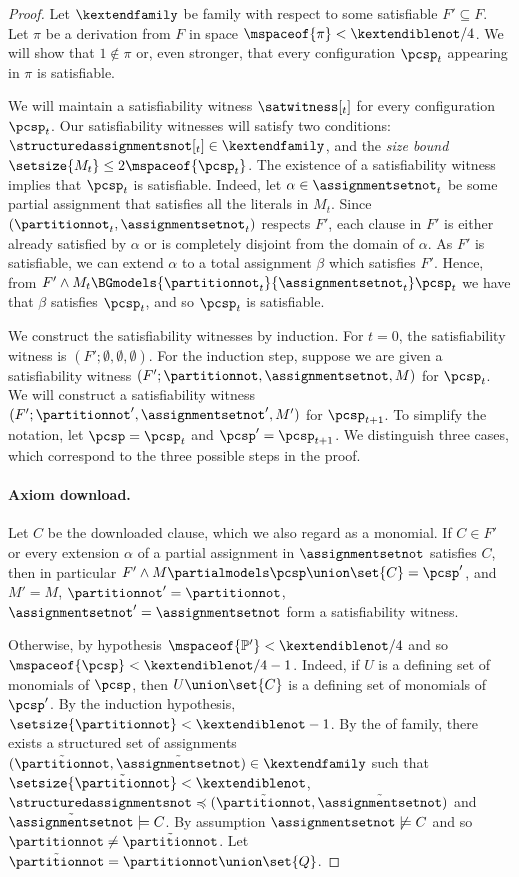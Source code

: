 \documentclass{toc}
\begin{document}
\begin{proof}
  Let $\kextendfamily$ be \akextendible family with respect to some satisfiable $F'\subseteq F$. Let $\pi$ be a derivation from $F$ in space $\mspaceof{\pi}< \kextendiblenot/4$. We will show that $1 \notin\pi$ or, even stronger, that every configuration $\pcsp_t$ appearing in $\pi$ is satisfiable.

  We will maintain a satisfiability witness $\satwitness[_t]$ for every configuration $\pcsp_t$. Our satisfiability witnesses will satisfy two conditions: $\structuredassignmentsnot[_t] \in \kextendfamily$, and the \emph{size bound} $\setsize{M_t} \leq 2\mspaceof{\pcsp_t}$. The existence of a satisfiability witness implies that $\pcsp_t$ is satisfiable. Indeed, let $\alpha \in \assignmentsetnot_t$ be some partial assignment that satisfies all the literals in $M_t$. Since $(\partitionnot_t,\assignmentsetnot_t)$ respects $F'$, each clause in $F'$ is either already satisfied by $\alpha$ or is completely disjoint from the domain of $\alpha$. As $F'$ is satisfiable, we can extend $\alpha$ to a total assignment $\beta$ which satisfies $F'$. Hence, from $F' \land M_t \BGmodels{\partitionnot_t}{\assignmentsetnot_t} \pcsp_t$ we have that $\beta$ satisfies $\pcsp_t$, and so $\pcsp_t$ is satisfiable.

  We construct the satisfiability witnesses by induction. For $t = 0$, the satisfiability witness is $(F';\emptyset,\emptyset,\emptyset)$. For the induction step, suppose we are given a satisfiability witness $(F';\partitionnot,\assignmentsetnot,M)$ for $\pcsp_t$. We will construct a satisfiability witness $(F';\partitionnot',\assignmentsetnot',M')$ for $\pcsp_{t+1}$. To simplify the notation, let $\pcsp=\pcsp_t$ and $\pcsp'=\pcsp_{t+1}$. We distinguish three cases, which correspond to the three possible steps in the proof.

%
%
%
\paragraph{Axiom download.} Let $C$ be the downloaded clause, which we also regard as a monomial. If $C\in F'$ or every extension $\alpha$ of a partial assignment in $\assignmentsetnot$ satisfies $C$, then in particular $F'\land M \partialmodels \pcsp\union\set{C}=\pcsp'$, and $M'=M$, $\partitionnot'=\partitionnot$, $\assignmentsetnot'=\assignmentsetnot$ form a satisfiability witness.

Otherwise, by hypothesis $\mspaceof{\mathbb{P'}}< \kextendiblenot/4$ and so $\mspaceof{\pcsp}<\kextendiblenot/4-1$. Indeed, if $U$ is a %
defining set of monomials
of $\pcsp$, then $U\union\set{C}$ is a %
defining set of monomials
of $\pcsp'$. By the induction hypothesis, $\setsize{\partitionnot}<\kextendiblenot-1$. By the \extensionproperty of \kextendibleNok family, there exists a structured set of assignments $(\tilde{\partitionnot},\tilde{\assignmentsetnot})\in\kextendfamily$ such that $\setsize{\tilde{\partitionnot}}< \kextendiblenot$, $\structuredassignmentsnot\preccurlyeq(\tilde{\partitionnot},\tilde{\assignmentsetnot})$ and $\tilde{\assignmentsetnot}\models C$. By assumption $\assignmentsetnot\not\models C$ and so $\partitionnot\neq\tilde{\partitionnot}$. Let $\tilde{\partitionnot} = \partitionnot \union \set{Q}$.


\end{proof}
\end{document}
